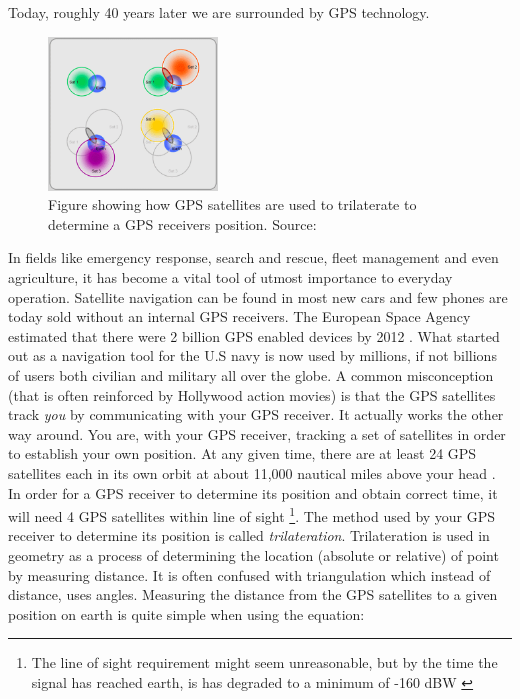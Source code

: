 \documentclass[12pt,english,a4paper]{article}
\begin{document}
Today, roughly 40 years later we are surrounded by GPS technology.
\begin{figure}
  \centering
  \includegraphics[width=0.40\textwidth]{trilaterate.jpg}
  \caption[GPS trilaterate figure]
   {Figure showing how GPS satellites are used to trilaterate to determine a GPS receivers position. Source: \cite{GISTRILATERATE}}
\end{figure}
In fields like emergency response, search and rescue, fleet management and even agriculture, it has become a vital tool of utmost importance to everyday operation. Satellite navigation can be found in most new cars and few phones are today sold without an internal GPS receivers. The European Space Agency estimated that there were 2 billion GPS enabled devices by 2012 \cite{ESA}. What started out as a navigation tool for the U.S navy is now used by millions, if not billions of users both civilian and military all over the globe. A common misconception (that is often reinforced by Hollywood action movies) is that the GPS satellites track \textit{you} by communicating with your GPS receiver. It actually works the other way around. You are, with your GPS receiver, tracking a set of satellites in order to establish your own position. At any given time, there are at least 24 GPS satellites each in its own orbit at about 11,000 nautical miles above your head \cite{GPSGOVSS}. In order for a GPS receiver to determine its position and obtain correct time, it will need 4 GPS satellites within line of sight \footnote{The line of sight requirement might seem unreasonable, but by the time the signal has reached earth, is has degraded to a minimum of -160 dBW \cite{NATINT}}.
The method used by your GPS receiver to determine its position is called \textit{trilateration}. 
Trilateration is used in geometry as a process of determining the location (absolute or relative) of point by measuring distance. It is often confused with triangulation which instead of distance, uses angles. Measuring the distance from the GPS satellites to a given position on earth is quite simple when using the equation: 
\end{document}
